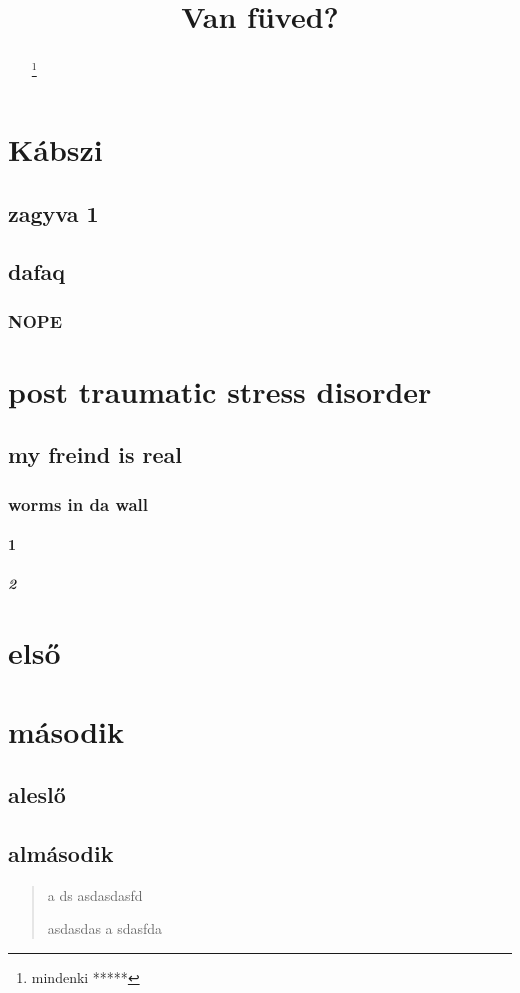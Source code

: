 \documentclass{article}
\title{Van füved?}
\begin{document}
\maketitle
\begin{abstract}
\texttt{\lipsum[3-4]}
\renewcommand{\thefootnote}{\fnsymbol{footnote}}
\footnote{mindenki *****}
\end{abstract}
\setcounter{secnumdepth}{10}
\setcounter{tocdepth}{10}
\renewcommand{\contentsname}{MI FOLYIK ITT GYÖNGYÖSÖN!?}
\tableofcontents
\clearpage
{}
\section{Kábszi}
\subsection{zagyva 1}
\hulipsum[3]
\subsection{dafaq}
\hulipsum[4]
\subsubsection{NOPE}
\hulipsum[1]
\section[ptsd]{post traumatic stress disorder}
\subsection{my freind is real}
\subsubsection{worms in da wall}
\paragraph{1}
\subparagraph{2}
\hulipsum[2]
\quote
\lipsum[5-6]
\quotation
\hulipsum[6-7]
\tableofcontents
\appendix
\section{első}
\section{második}
\subsection{aleslő}
\subsection{almásodik}
\begin{verse}
a
ds
asdasdasfd
\newline

asdasdas
a
sdasfda
\end{verse}
\end{document}
